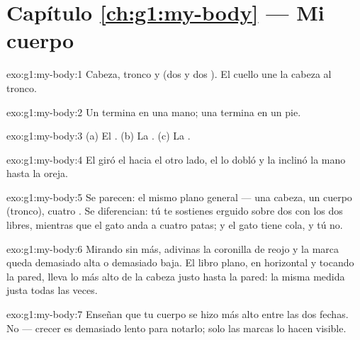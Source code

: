 \section*{Capítulo \ref{ch:g1:my-body} --- Mi cuerpo}

\begin{solution}{exo:g1:my-body:1}
Cabeza, tronco y  (dos  y dos ). El cuello
une la cabeza al tronco.
\end{solution}

\begin{solution}{exo:g1:my-body:2}
Un  termina en una mano; una  termina en un pie.
\end{solution}

\begin{solution}{exo:g1:my-body:3}
(a) El . (b) La . (c) La .
\end{solution}

\begin{solution}{exo:g1:my-body:4}
El  giró el  hacia el otro lado, el  lo dobló y la
 inclinó la mano hasta la oreja.
\end{solution}

\begin{solution}{exo:g1:my-body:5}
Se parecen: el mismo plano general --- una cabeza, un cuerpo (tronco),
cuatro . Se diferencian: tú te sostienes erguido sobre dos
 con los dos  libres, mientras que el gato anda a cuatro
patas; y el gato tiene cola, y tú no.
\end{solution}

\begin{solution}{exo:g1:my-body:6}
Mirando sin más, adivinas la coronilla de reojo y la marca queda
demasiado alta o demasiado baja. El libro plano, en horizontal y
tocando la pared, lleva lo más alto de la cabeza justo hasta la pared:
la misma medida justa todas las veces.
\end{solution}

\begin{solution}{exo:g1:my-body:7}
Enseñan que tu cuerpo se hizo más alto entre las dos fechas. No ---
crecer es demasiado lento para notarlo; solo las marcas lo hacen visible.
\end{solution}

